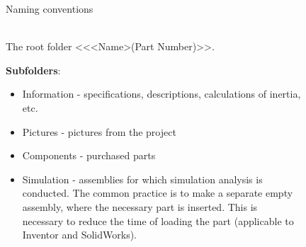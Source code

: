 \documentclass[aspectratio=169]{beamer}
\begin{document}
\begin{frame}[t]{Naming conventions}
    \framesubtitle{}
    \vspace{-0.6cm}
    \begin{columns}[T,onlytextwidth]
        \begin{column}{0.55\textwidth}
            The root folder <<<Name>(Part Number)>>.

            \textbf{Subfolders}:
            \begin{itemize}
                \item Information - specifications, descriptions, calculations of inertia, etc.
                \item Pictures - pictures from the project
                \item Components - purchased parts
                \item Simulation - assemblies for which simulation analysis is conducted. The common practice is to make a separate empty assembly, where the necessary part is inserted. This is necessary to reduce the time of loading the part (applicable to Inventor and SolidWorks).
            \end{itemize}

        \end{column}
        \begin{column}{0.44\textwidth}
            \vspace{-1cm}
            \begin{figure}[H]
                \centering\includegraphics[height=7.2cm,width=1\textwidth,keepaspectratio]{name_1.png}
                \label{fig:name_1.png}
            \end{figure}
        \end{column}
    \end{columns}
\end{frame}
\end{document}
